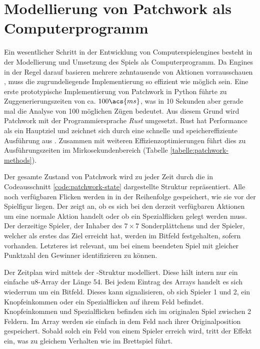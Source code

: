 \chapter[Modellierung als Computerprogramm]{Modellierung von Patchwork als Computerprogramm}
\label{chapter:modellierung-von-patchwork-als-computerprogramm}

Ein wesentlicher Schritt in der Entwicklung von Computerspielengines besteht in der Modellierung und Umsetzung des Spiels als Computerprogramm. Da Engines in der Regel darauf basieren mehrere zehntausende von Aktionen vorrausschauen \cite{2018.AlphaZero}, muss die zugrundeliegende Implementierung so effizient wie möglich sein. Eine erste prototypische Implementierung von Patchwork in Python führte zu Zuggenerierungszeiten von ca. $100\acs{ms}$, was in 10 Sekunden aber gerade mal die Analyse von 100 möglichen Zügen bedeutet. Aus diesem Grund wird Patchwork mit der Programmiersprache \emph{Rust} \cite{2014.Rust} umgesetzt. Rust hat Performance als ein Hauptziel und zeichnet sich durch eine schnelle und speichereffiziente Ausführung aus \cite{2024.Rust}. Zusammen mit weiteren Effizienzoptimierungen führt dies zu Ausführungszeiten im Mirkosekundenbereich (Tabelle \ref{tabelle:patchwork-methods}).



Der gesamte Zustand von Patchwork wird zu jeder Zeit durch die in Codeausschnitt \ref{code:patchwork-state} dargestellte Struktur  repräsentiert. Alle noch verfügbaren Flicken werden in  in der Reihenfolge gespeichert, wie sie vor der Spielfigur liegen. Der  zeigt an, ob es sich bei den derzeit verfügbaren Aktionen um eine normale Aktion handelt oder ob ein Spezialflicken gelegt werden muss. Der derzeitige Spieler, der Inhaber des $7\times 7$ Sonderplättchens und der Spieler, welcher als erstes das Ziel erreicht hat, werden im Bitfeld  festgehalten, sofern vorhanden. Letzteres ist relevant, um bei einem beendeten Spiel mit gleicher Punktzahl den Gewinner identifizieren zu können.

Der Zeitplan wird mittels der -Struktur modelliert. Diese hält intern nur ein einfache \ac{u8}-Array der Länge 54. Bei jedem Eintrag des Arrays handelt es sich wiederrum um ein Bitfeld. Dieses kann signalisieren, ob sich Spieler 1 und 2, ein Knopfeinkommen oder ein Spezialflicken auf ihrem Feld befindet. Knopfeinkommen und Spezialflicken befinden sich im originalen Spiel zwischen 2 Feldern. Im Array werden sie einfach in dem Feld nach ihrer Originalposition gespeichert. Sobald solch ein Feld von einem Spieler erreich wird, tritt der Effekt ein, was zu gleichem Verhalten wie im Brettspiel führt.

